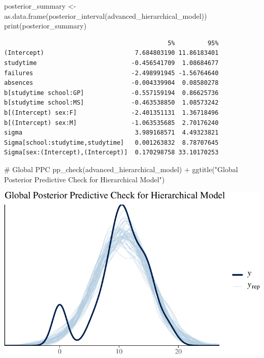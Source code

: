 \documentclass[
  10pt,
]{article}
\newenvironment{Shaded}{\begin{snugshade}}{\end{snugshade}}
\newcommand{\CommentTok}[1]{\textcolor[rgb]{0.37,0.37,0.37}{#1}}
\newcommand{\FunctionTok}[1]{\textcolor[rgb]{0.28,0.35,0.67}{#1}}
\newcommand{\NormalTok}[1]{\textcolor[rgb]{0.00,0.23,0.31}{#1}}
\newcommand{\OtherTok}[1]{\textcolor[rgb]{0.00,0.23,0.31}{#1}}
\newcommand{\SpecialCharTok}[1]{\textcolor[rgb]{0.37,0.37,0.37}{#1}}
\newcommand{\StringTok}[1]{\textcolor[rgb]{0.13,0.47,0.30}{#1}}
\begin{document}
\begin{Shaded}
\begin{Highlighting}[]
\NormalTok{posterior\_summary }\OtherTok{\textless{}{-}} \FunctionTok{as.data.frame}\NormalTok{(}\FunctionTok{posterior\_interval}\NormalTok{(advanced\_hierarchical\_model))}
\FunctionTok{print}\NormalTok{(posterior\_summary)}
\end{Highlighting}
\end{Shaded}

\begin{verbatim}
                                             5%         95%
(Intercept)                         7.684803190 11.86183401
studytime                          -0.456541709  1.08684677
failures                           -2.498991945 -1.56764640
absences                           -0.004339904  0.08580278
b[studytime school:GP]             -0.557159194  0.86625736
b[studytime school:MS]             -0.463538850  1.08573242
b[(Intercept) sex:F]               -2.401351131  1.36718496
b[(Intercept) sex:M]               -1.063535685  2.70176240
sigma                               3.989168571  4.49323821
Sigma[school:studytime,studytime]   0.001263832  8.78707645
Sigma[sex:(Intercept),(Intercept)]  0.170298758 33.10170253
\end{verbatim}

\begin{Shaded}
\begin{Highlighting}[]
\CommentTok{\# Global PPC}
\FunctionTok{pp\_check}\NormalTok{(advanced\_hierarchical\_model) }\SpecialCharTok{+}
  \FunctionTok{ggtitle}\NormalTok{(}\StringTok{"Global Posterior Predictive Check for Hierarchical Model"}\NormalTok{)}
\end{Highlighting}
\end{Shaded}

\includegraphics{551-HW-Q3_files/figure-pdf/unnamed-chunk-8-1.pdf}
\end{document}
